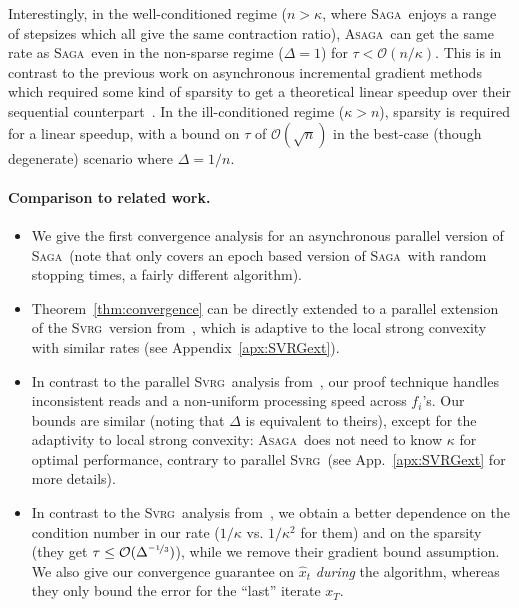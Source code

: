 \documentclass[twoside]{article}
\newcommand{\overlap}{\tau}
\newcommand{\sparsity}{\Delta}
\newcommand{\ASAGA}{\textsc{Asaga}}
\newcommand{\SAGA}{\textsc{Saga}}
\newcommand{\SVRG}{\textsc{Svrg}}
\begin{document}
\vspace{-2mm}
Interestingly, in the well-conditioned regime ($n > \kappa$, where \SAGA\ enjoys a range of stepsizes which all give the same contraction ratio), \ASAGA\ can get the same rate as \SAGA\ even in the non-sparse regime ($\sparsity = 1$) for $\overlap < \mathcal{O}(n/\kappa)$. This is in contrast to the previous work on asynchronous incremental gradient methods which required some kind of sparsity to get a theoretical linear speedup over their sequential counterpart~\citep{hogwild,mania}. 
In the ill-conditioned regime ($\kappa > n$), sparsity is required for a linear speedup, with a bound on $\overlap$ of $\mathcal{O}(\sqrt{n})$ in the best-case (though degenerate) scenario where $\sparsity = 1/n$.

\vspace{-2mm}
\paragraph{Comparison to related work.}
\begin{itemize}[leftmargin=1.5em, topsep=-1mm, itemsep=-0.7mm]
\item We give the first convergence analysis for an asynchronous parallel version of \SAGA\ (note that \citet{smola} only covers an epoch based version of \SAGA\ with random stopping times, a fairly different algorithm).
\item Theorem~\ref{thm:convergence} can be directly extended to a parallel extension of the \SVRG\ version from~\citet{qsaga}, which is adaptive to the local strong convexity with similar rates (see Appendix~\ref{apx:SVRGext}).
\item In contrast to the parallel \SVRG\ analysis from~\citet[Thm. 2]{smola}, our proof technique handles inconsistent reads and a non-uniform processing speed across $f_i$'s. 
Our bounds are similar (noting that $\sparsity$ is equivalent to theirs), except for the adaptivity to local strong convexity: \ASAGA\ does not need to know $\kappa$ for optimal performance, contrary to parallel \SVRG\ (see App.~\ref{apx:SVRGext} for more details).
\item In contrast to the \SVRG\ analysis from~\citet[Thm. 14]{mania}, we obtain a better dependence on the condition number in our rate ($1/\kappa$ vs. $1/\kappa^2$ for them) and on the sparsity (they get $\overlap \leq \mathcal{O}(\sparsity^{\nicefrac{-1}{3}})$), while we remove their gradient bound assumption.
We also give our convergence guarantee on $\hat{x}_t$ \emph{during} the algorithm, whereas they only bound the error for the ``last'' iterate $x_T$.
\end{itemize}
\end{document}
